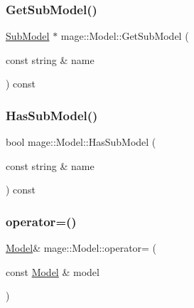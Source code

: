 \hypertarget{classmage_1_1_model_a1cae9eb62a353445d14b5331e88bdeac}{}\label{classmage_1_1_model_a1cae9eb62a353445d14b5331e88bdeac} 
\subsubsection{\texorpdfstring{Get\+Sub\+Model()}{GetSubModel()}}
{\footnotesize\ttfamily \hyperlink{classmage_1_1_sub_model}{Sub\+Model} $\ast$ mage\+::\+Model\+::\+Get\+Sub\+Model (\begin{DoxyParamCaption}\item[{const string \&}]{name }\end{DoxyParamCaption}) const}

\hypertarget{classmage_1_1_model_a319fb9b9d9c673ed9c83325d5bcbdfd7}{}\label{classmage_1_1_model_a319fb9b9d9c673ed9c83325d5bcbdfd7} 
\subsubsection{\texorpdfstring{Has\+Sub\+Model()}{HasSubModel()}}
{\footnotesize\ttfamily bool mage\+::\+Model\+::\+Has\+Sub\+Model (\begin{DoxyParamCaption}\item[{const string \&}]{name }\end{DoxyParamCaption}) const}

\hypertarget{classmage_1_1_model_a563515c64ec39cfcda9f6ca37576391b}{}\label{classmage_1_1_model_a563515c64ec39cfcda9f6ca37576391b} 
\subsubsection{\texorpdfstring{operator=()}{operator=()}\hspace{0.1cm}{\footnotesize\ttfamily [1/2]}}
{\footnotesize\ttfamily \hyperlink{classmage_1_1_model}{Model}\& mage\+::\+Model\+::operator= (\begin{DoxyParamCaption}\item[{const \hyperlink{classmage_1_1_model}{Model} \&}]{model }\end{DoxyParamCaption})\hspace{0.3cm}{\ttfamily [delete]}}

